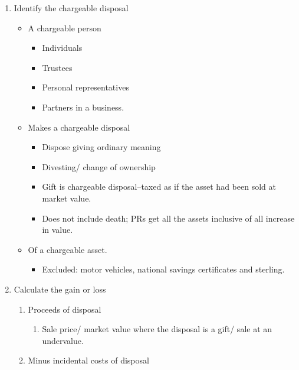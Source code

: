\documentclass[
]{article}
\providecommand{\tightlist}{%
  \setlength{\itemsep}{0pt}\setlength{\parskip}{0pt}}
\begin{document}
\begin{enumerate}
\def\labelenumi{\arabic{enumi}.}
\tightlist
\item
  Identify the chargeable disposal

  \begin{itemize}
  \tightlist
  \item
    A chargeable person

    \begin{itemize}
    \tightlist
    \item
      Individuals
    \item
      Trustees
    \item
      Personal representatives
    \item
      Partners in a business.
    \end{itemize}
  \item
    Makes a chargeable disposal

    \begin{itemize}
    \tightlist
    \item
      Dispose giving ordinary meaning
    \item
      Divesting/ change of ownership
    \item
      Gift is chargeable disposal--taxed as if the asset had been sold
      at market value.
    \item
      Does not include death; PRs get all the assets inclusive of all
      increase in value.
    \end{itemize}
  \item
    Of a chargeable asset.

    \begin{itemize}
    \tightlist
    \item
      Excluded: motor vehicles, national savings certificates and
      sterling.
    \end{itemize}
  \end{itemize}
\item
  Calculate the gain or loss

  \begin{enumerate}
  \def\labelenumii{\arabic{enumii}.}
  \tightlist
  \item
    Proceeds of disposal

    \begin{enumerate}
    \def\labelenumiii{\arabic{enumiii}.}
    \tightlist
    \item
      Sale price/ market value where the disposal is a gift/ sale at an
      undervalue.
    \end{enumerate}
  \item
    Minus incidental costs of disposal


\end{enumerate}
\end{enumerate}
\end{document}
